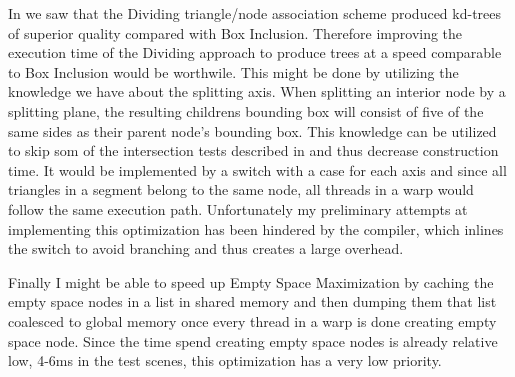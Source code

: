 In  we saw that the Dividing triangle/node association
scheme produced kd-trees of superior quality compared with Box
Inclusion. Therefore improving the execution time of the Dividing approach to
produce trees at a speed comparable to Box Inclusion would be worthwile. This
might be done by utilizing the knowledge we have about the splitting axis. When
splitting an interior node by a splitting plane, the resulting childrens
bounding box will consist of five of the same sides as their parent node's
bounding box. This knowledge can be utilized to skip som of the intersection
tests described in  and thus decrease construction
time. It would be implemented by a switch with a case for each axis and since
all triangles in a segment belong to the same node, all threads in a warp would
follow the same execution path. Unfortunately my preliminary attempts at
implementing this optimization has been hindered by the compiler, which inlines
the switch to avoid branching and thus creates a large overhead.


Finally I might be able to speed up Empty Space Maximization by caching the
empty space nodes in a list in shared memory and then dumping them that list
coalesced to global memory once every thread in a warp is done creating empty
space node. Since the time spend creating empty space nodes is already relative
low, 4-6ms in the test scenes, this optimization has a very low priority.







